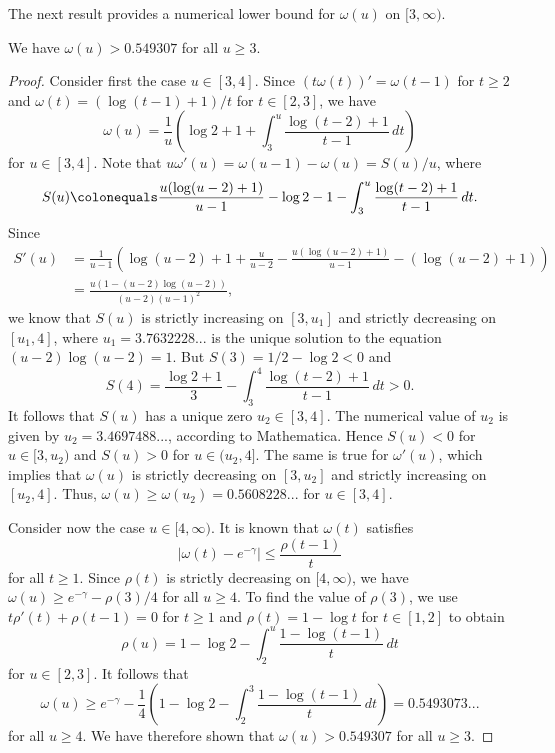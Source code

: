 \documentclass[12pt,reqno]{amsart}
\begin{document}
The next result provides a numerical lower bound for $\omega(u)$ on $[3,\infty)$.
\begin{lem}\label{Lem:minomega(u)foru>=3}
We have $\omega(u)>0.549307$ for all $u\ge3$.
\end{lem}
\begin{proof}
Consider first the case $u\in[3,4]$. Since $(t\omega(t))'=\omega(t-1)$ for $t\ge2$ and $\omega(t)=(\log(t-1)+1)/t$ for $t\in[2,3]$, we have
\[\omega(u)=\frac{1}{u}\left(\log 2+1+\int_{3}^{u}\frac{\log(t-2)+1}{t-1}\,dt\right)\]
for $u\in[3,4]$. Note that $u\omega'(u)=\omega(u-1)-\omega(u)=S(u)/u$, where
\[S(u)\colonequals\frac{u(\log(u-2)+1)}{u-1}-\log2-1-\int_{3}^{u}\frac{\log(t-2)+1}{t-1}\,dt.\]
Since
\begin{align*}
S'(u)&=\frac{1}{u-1}\left(\log(u-2)+1+\frac{u}{u-2}-\frac{u(\log(u-2)+1)}{u-1}-(\log(u-2)+1)\right)\\
&=\frac{u(1-(u-2)\log(u-2))}{(u-2)(u-1)^2},
\end{align*}
we know that $S(u)$ is strictly increasing on $[3,u_1]$ and strictly decreasing on $[u_1,4]$, where $u_1=3.7632228...$ is the unique solution to the equation $(u-2)\log(u-2)=1$. But $S(3)=1/2-\log2<0$ and
\[S(4)=\frac{\log2+1}{3}-\int_{3}^{4}\frac{\log(t-2)+1}{t-1}\,dt>0.\]
It follows that $S(u)$ has a unique zero $u_2\in[3,4]$. The numerical value of $u_2$ is given by $u_2=3.4697488...$, according to Mathematica. Hence $S(u)<0$ for $u\in[3,u_2)$ and $S(u)>0$ for $u\in(u_2,4]$. The same is true for $\omega'(u)$, which implies that $\omega(u)$ is strictly decreasing on $[3,u_2]$ and strictly increasing on $[u_2,4]$. Thus, $\omega(u)\ge\omega(u_2)=0.5608228...$ for $u\in[3,4]$. 
\par Consider now the case $u\in[4,\infty)$. It is known \cite{JR} that $\omega(t)$ satisfies
\[|\omega(t)-e^{-\gamma}|\leq \frac{\rho(t-1)}{t}\]
for all $t\geq1$. Since $\rho(t)$ is strictly decreasing on $[4,\infty)$, we have $\omega(u)\ge e^{-\gamma}-\rho(3)/4$ for all $u\ge4$. To find the value of $\rho(3)$, we use $t\rho'(t)+\rho(t-1)=0$ for $t\ge1$ and $\rho(t)=1-\log t$ for $t\in[1,2]$ to obtain
\[\rho(u)=1-\log 2-\int_{2}^{u}\frac{1-\log(t-1)}{t}\,dt\]
for $u\in[2,3]$. It follows that
\[\omega(u)\ge e^{-\gamma}-\frac{1}{4}\left(1-\log 2-\int_{2}^{3}\frac{1-\log(t-1)}{t}\,dt\right)=0.5493073...\]
for all $u\ge4$. We have therefore shown that $\omega(u)>0.549307$ for all $u\ge3$.
\end{proof}
\end{document}
